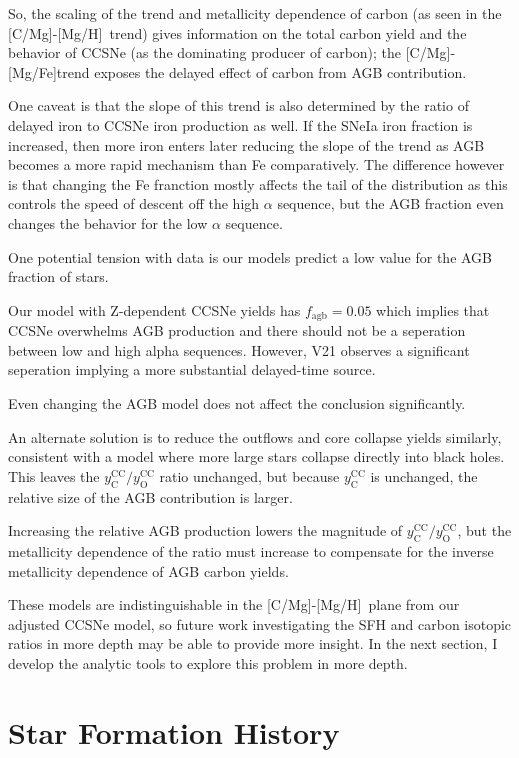\documentclass[12pt,oneside]{report}
\newcommand{\caah}{[C/Mg]-[Mg/H]}
\newcommand{\caafe}{[C/Mg]-[Mg/Fe]}
\begin{document}
So, the scaling of the trend and metallicity dependence of carbon (as seen in
the \caah~trend) gives information on the total carbon yield and the behavior
of CCSNe (as the dominating producer of carbon);
the \caafe trend exposes the delayed effect of carbon from AGB contribution.

One caveat is that the slope of this trend is also determined by the ratio of delayed iron to CCSNe iron production as well. If the SNeIa iron fraction is increased, then more iron enters later reducing the slope of the trend as AGB becomes a more rapid mechanism than Fe comparatively. The difference however is that changing the Fe franction mostly affects the tail of the distribution as this controls the speed of descent off the high $\alpha$ sequence, but the AGB fraction even changes the behavior for the low $\alpha$ sequence.

One potential tension with data is our models predict a low value for the AGB fraction of stars. 

Our model with Z-dependent CCSNe yields has $f_\text{agb} = 0.05$ which implies that CCSNe overwhelms AGB production and there should not be a seperation between low and high alpha sequences. However, V21 observes a significant seperation implying a more substantial delayed-time source. 

Even changing the AGB model does not affect the conclusion significantly. 

An alternate solution is to reduce the outflows and core collapse yields similarly, consistent with a model where more large stars collapse directly into black holes. This leaves the $y_\text{C}^\text{CC}/y_\text{O}^\text{CC}$ ratio unchanged, but because $y_\text{C}^\text{CC}$ is unchanged, the relative size of the AGB contribution is larger. 


Increasing the relative AGB production lowers the magnitude of  $y_\text{C}^\text{CC}/y_\text{O}^\text{CC}$, but the metallicity dependence of the ratio must increase to compensate for the inverse metallicity dependence of AGB carbon yields. 

These models are indistinguishable in the \caah~plane from our adjusted CCSNe model, so future work investigating the SFH and carbon isotopic ratios in more depth may be able to provide more insight. In the next section, I develop the analytic tools to explore this problem in more depth. 

\section{Star Formation History} \label{sec:sfh}
\end{document}
